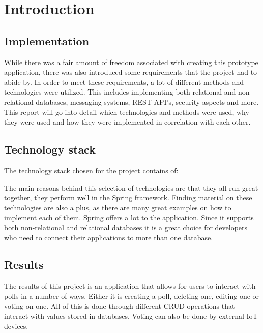 \section{Introduction}
\label{sec:introduction}

\subsection{Implementation}
\label{sub:implementation} While there was a fair amount of freedom associated with creating this prototype application, there was also introduced some requirements that the project had to abide by. In order to meet these requirements, a lot of different methods and technologies were utilized.  This includes implementing both relational and non-relational databases, messaging systems, REST API’s, security aspects and more. This report will go into detail which technologies and methods were used, why they were used and how they were implemented in correlation with each other.

\subsection{Technology stack}
\label{sub:techstack}
The technology stack chosen for the project contains of:
\begin{description}[noitemsep]
    \item[Firebase]
    \item[RabbitMQ]
    \item[Spring framework]
    \item[Dweet.io]
    \item[H2 Database]
\end{description}
The main reasons behind this selection of technologies are that they all run great together, they perform well in the Spring framework. Finding material on these technologies are also a plus, as there are many great examples on how to implement each of them. Spring offers a lot to the application. Since it supports both non-relational and relational databases it is a great choice for developers who need to connect their applications to more than one database. 
\subsection{Results}
\label{sub:results}The results of this project is an application that allows for users to interact with polls in a number of ways. Either it is creating a poll, deleting one, editing one or voting on one. All of this is done through different CRUD operations that interact with values stored in databases. Voting can also be done by external IoT devices. 

